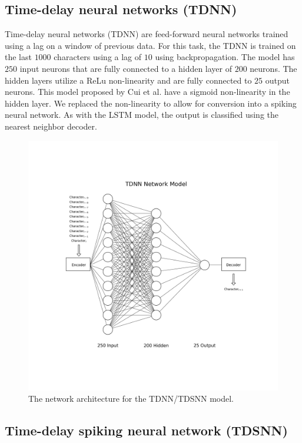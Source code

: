 \documentclass{article}
\begin{document}
\subsection*{Time-delay neural networks (TDNN)}

Time-delay neural networks (TDNN) are feed-forward neural networks trained using a lag on a window of previous data. \cite{waibel1995phoneme} For this task, the TDNN is trained on the last $1000$ characters using a lag of $10$ using backpropagation. \cite{rojas1996backpropagation} The model has $250$ input neurons that are fully connected to a hidden layer of $200$ neurons. The hidden layers utilize a ReLu non-linearity and are fully connected to $25$ output neurons. This model proposed by Cui et al. have a sigmoid non-linearity in the hidden layer. We replaced the non-linearity to allow for conversion into a spiking neural network. As with the LSTM model, the output is classified using the nearest neighbor decoder.


\begin{figure}[!h]
    \centering
    \includegraphics[width=\linewidth]{../diagrams/tdnn.png}
    \caption{The network architecture for the TDNN/TDSNN model.}
    \label{fig:lstm-online-model}
\end{figure}

\subsection*{Time-delay spiking neural network (TDSNN)}
\end{document}
